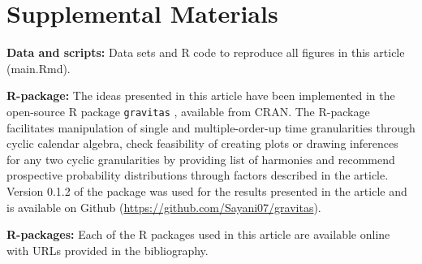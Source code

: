 \documentclass[12pt]{article}
\begin{document}
\hypertarget{supplemental-materials}{%
\section{Supplemental Materials}\label{supplemental-materials}}

\textbf{Data and scripts:} Data sets and R code to reproduce all figures in this article (main.Rmd).

\textbf{R-package:} The ideas presented in this article have been implemented in the open-source R \citep{R-language} package \texttt{gravitas} \citep{R-gravitas}, available from CRAN. The R-package facilitates manipulation of single and multiple-order-up time granularities through cyclic calendar algebra, check feasibility of creating plots or drawing inferences for any two cyclic granularities by providing list of harmonies and recommend prospective probability distributions through factors described in the article. Version 0.1.2 of the package was used for the results presented in the article and is available on Github (\url{https://github.com/Sayani07/gravitas}).

\textbf{R-packages:} Each of the R packages used in this article are available online with URLs provided in the bibliography.



\end{document}
